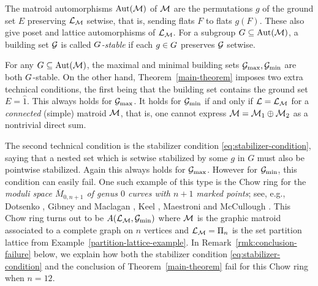  The matroid automorphisms $\operatorname{\mathrm{Aut}}(\mathcal{M})$ of $\mathcal{M}$ are the permutations $g$ of the ground set $E$ preserving $\mathcal{L}_{\mathcal{M}}$ setwise, that is, sending flats $F$ to flats $g(F)$.  These also give poset and
lattice automorphisms of $\mathcal{L}_{\mathcal{M}}$. For a subgroup $G \subseteq \operatorname{\mathrm{Aut}}(\mathcal{M})$, a building set $\mathcal{G}$ is called \textit{$G$-stable} if each $g \in G$ preserves $\mathcal{G}$ setwise.

\begin{example}
\label{ex:maximal-and-minimal-versus-hypotheses}
For any $G \subseteq \operatorname{\mathrm{Aut}}(\mathcal{M})$, the maximal and minimal building sets 
$\mathcal{G}_{\max}, \mathcal{G}_{\min}$ are both $G$-stable.  
On the other hand, Theorem~\ref{main-theorem} imposes two extra technical conditions, the first being that the building set contains the ground set $E=\hat{1}$.
This always holds for $\mathcal{G}_{\max}$.  It holds for $\mathcal{G}_{\min}$ if and only if $\mathcal{L}=\mathcal{L}_{\mathcal{M}}$ for a {\it connected} (simple) matroid $\mathcal{M}$, that is, one cannot express $\mathcal{M} = \mathcal{M}_1 \oplus \mathcal{M}_2$ as a nontrivial direct sum.  

The second technical condition is the
stabilizer condition \eqref{eq:stabilizer-condition}, saying that a nested set which is setwise stabilized by some 
$g$ in $G$ must also be pointwise stabilized.  Again this always holds for $\mathcal{G}_{\max}$.  However for $\mathcal{G}_{\min}$, this condition can easily fail.  One such example of this type is the Chow ring for the {\it moduli space $\overline{M}_{0,n+1}$ of genus $0$ curves with $n+1$ marked points}; see, e.g., Dotsenko \cite{dotsenko}, Gibney and Maclagan \cite{GibneyMaclagan},  Keel \cite{Keel}, Maestroni and McCullough \cite[Rmk.~2.4]{MaestroniMcCullough}. This Chow ring turns out to be
$A(\mathcal{L}_{\mathcal{M}},\mathcal{G}_{\min})$ where $\mathcal{M}$ is the graphic matroid associated to a complete graph on $n$ vertices and $\mathcal{L}_{\mathcal{M}}=\Pi_n$ is the set partition lattice from Example~\ref{partition-lattice-example}. In Remark~\ref{rmk:conclusion-failure} below, we explain how both the stabilizer condition \eqref{eq:stabilizer-condition} and the conclusion of Theorem~\ref{main-theorem} fail for this Chow ring when $n=12$.



\end{example}



